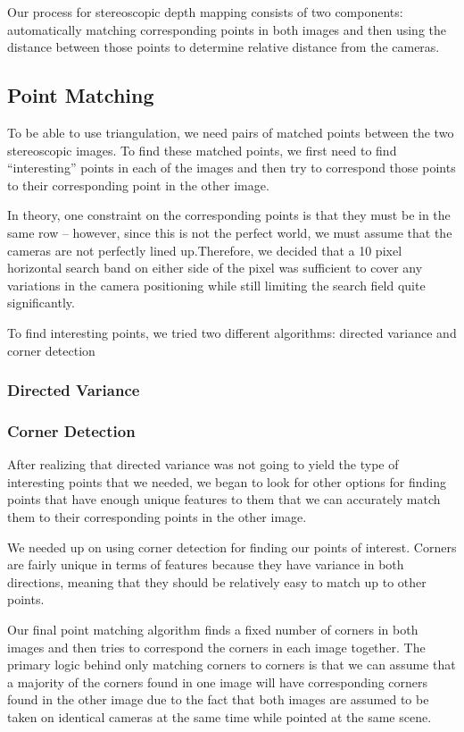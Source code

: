 Our process for stereoscopic depth mapping consists of two components: automatically matching corresponding points in both images and then using the distance between those points to determine relative distance from the cameras. 

\subsection{Point Matching}
To be able to use triangulation, we need pairs of matched points between the two stereoscopic images. To find these matched points, we first need to find ``interesting'' points in each of the images and then try to correspond those points to their corresponding point in the other image. 

In theory, one constraint on the corresponding points is that they must be in the same row -- however, since this is not the perfect world, we must assume that the cameras are not perfectly lined up.Therefore, we decided that a 10 pixel horizontal search band on either side of the pixel was sufficient to cover any variations in the camera positioning while still limiting the search field quite significantly. 

To find interesting points, we tried two different algorithms: directed variance and corner detection

\subsubsection{Directed Variance}

\subsubsection{Corner Detection}
After realizing that directed variance was not going to yield the type of interesting points that we needed, we began to look for other options for finding points that have enough unique features to them that we can accurately match them to their corresponding points in the other image. 

We needed up on using corner detection for finding our points of interest. Corners are fairly unique in terms of features because they have variance in both directions, meaning that they should be relatively easy to match up to other points. 

Our final point matching algorithm finds a fixed number of corners in both images and then tries to correspond the corners in each image together. The primary logic behind only matching corners to corners is that we can assume that a majority of the corners found in one image will have corresponding corners found in the other image due to the fact that both images are assumed to be taken on identical cameras at the same time while pointed at the same scene.

